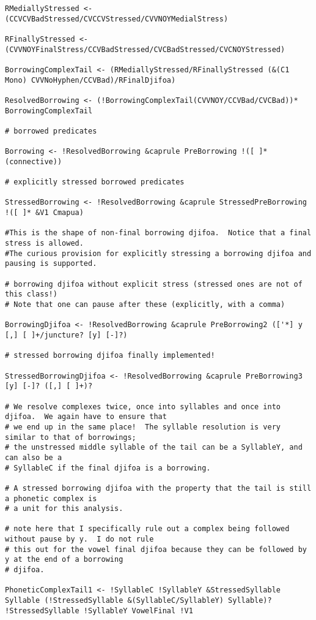\documentclass[12pt]{book}
\begin{document}
{\begin{verbatim}
RMediallyStressed <- (CCVCVBadStressed/CVCCVStressed/CVVNOYMedialStress)

RFinallyStressed <- (CVVNOYFinalStress/CCVBadStressed/CVCBadStressed/CVCNOYStressed)

BorrowingComplexTail <- (RMediallyStressed/RFinallyStressed (&(C1 Mono) CVVNoHyphen/CCVBad)/RFinalDjifoa)

ResolvedBorrowing <- (!BorrowingComplexTail(CVVNOY/CCVBad/CVCBad))* BorrowingComplexTail

# borrowed predicates

Borrowing <- !ResolvedBorrowing &caprule PreBorrowing !([ ]* (connective))

# explicitly stressed borrowed predicates

StressedBorrowing <- !ResolvedBorrowing &caprule StressedPreBorrowing !([ ]* &V1 Cmapua)

#This is the shape of non-final borrowing djifoa.  Notice that a final stress is allowed.
#The curious provision for explicitly stressing a borrowing djifoa and pausing is supported.

# borrowing djifoa without explicit stress (stressed ones are not of this class!)
# Note that one can pause after these (explicitly, with a comma)

BorrowingDjifoa <- !ResolvedBorrowing &caprule PreBorrowing2 (['*] y [,] [ ]+/juncture? [y] [-]?)

# stressed borrowing djifoa finally implemented!

StressedBorrowingDjifoa <- !ResolvedBorrowing &caprule PreBorrowing3 [y] [-]? ([,] [ ]+)?

# We resolve complexes twice, once into syllables and once into djifoa.  We again have to ensure that
# we end up in the same place!  The syllable resolution is very similar to that of borrowings;
# the unstressed middle syllable of the tail can be a SyllableY, and can also be a
# SyllableC if the final djifoa is a borrowing.

# A stressed borrowing djifoa with the property that the tail is still a phonetic complex is
# a unit for this analysis.

# note here that I specifically rule out a complex being followed without pause by y.  I do not rule
# this out for the vowel final djifoa because they can be followed by y at the end of a borrowing
# djifoa.

PhoneticComplexTail1 <- !SyllableC !SyllableY &StressedSyllable Syllable (!StressedSyllable &(SyllableC/SyllableY) Syllable)? !StressedSyllable !SyllableY VowelFinal !V1


\end{verbatim}}
\end{document}
